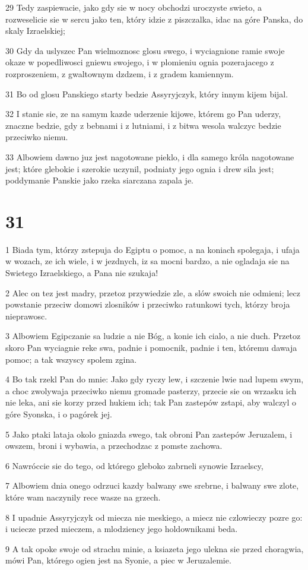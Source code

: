 \par 29 Tedy zaspiewacie, jako gdy sie w nocy obchodzi uroczyste swieto, a rozweselicie sie w sercu jako ten, który idzie z piszczalka, idac na góre Panska, do skaly Izraelskiej;
\par 30 Gdy da uslyszec Pan wielmoznosc glosu swego, i wyciagnione ramie swoje okaze w popedliwosci gniewu swojego, i w plomieniu ognia pozerajacego z rozproszeniem, z gwaltownym dzdzem, i z gradem kamiennym.
\par 31 Bo od glosu Panskiego starty bedzie Assyryjczyk, który innym kijem bijal.
\par 32 I stanie sie, ze na samym kazde uderzenie kijowe, którem go Pan uderzy, znaczne bedzie, gdy z bebnami i z lutniami, i z bitwa wesola walczyc bedzie przeciwko niemu.
\par 33 Albowiem dawno juz jest nagotowane pieklo, i dla samego króla nagotowane jest; które glebokie i szerokie uczynil, podniaty jego ognia i drew sila jest; poddymanie Panskie jako rzeka siarczana zapala je.

\chapter{31}

\par 1 Biada tym, którzy zstepuja do Egiptu o pomoc, a na koniach spolegaja, i ufaja w wozach, ze ich wiele, i w jezdnych, iz sa mocni bardzo, a nie ogladaja sie na Swietego Izraelskiego, a Pana nie szukaja!
\par 2 Alec on tez jest madry, przetoz przywiedzie zle, a slów swoich nie odmieni; lecz powstanie przeciw domowi zlosników i przeciwko ratunkowi tych, którzy broja nieprawosc.
\par 3 Albowiem Egipczanie sa ludzie a nie Bóg, a konie ich cialo, a nie duch. Przetoz skoro Pan wyciagnie reke swa, padnie i pomocnik, padnie i ten, któremu dawaja pomoc; a tak wszyscy spolem zgina.
\par 4 Bo tak rzekl Pan do mnie: Jako gdy ryczy lew, i szczenie lwie nad lupem swym, a choc zwolywaja przeciwko niemu gromade pasterzy, przecie sie on wrzasku ich nie leka, ani sie korzy przed hukiem ich; tak Pan zastepów zstapi, aby walczyl o góre Syonska, i o pagórek jej.
\par 5 Jako ptaki lataja okolo gniazda swego, tak obroni Pan zastepów Jeruzalem, i owszem, broni i wybawia, a przechodzac z pomste zachowa.
\par 6 Nawróccie sie do tego, od którego gleboko zabrneli synowie Izraelscy,
\par 7 Albowiem dnia onego odrzuci kazdy balwany swe srebrne, i balwany swe zlote, które wam naczynily rece wasze na grzech.
\par 8 I upadnie Assyryjczyk od miecza nie meskiego, a miecz nie czlowieczy pozre go: i uciecze przed mieczem, a mlodziency jego holdownikami beda.
\par 9 A tak opoke swoje od strachu minie, a ksiazeta jego ulekna sie przed choragwia, mówi Pan, którego ogien jest na Syonie, a piec w Jeruzalemie.

